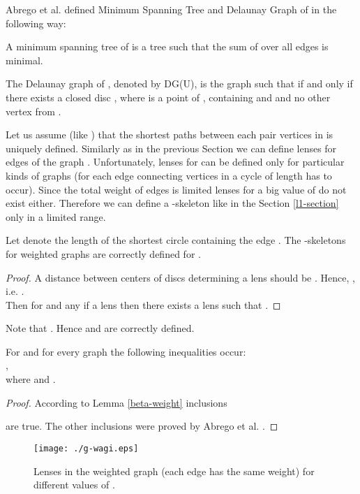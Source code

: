 \documentclass[11pt]{llncs}
\begin{document}
Abrego et al. \cite{a12} defined Minimum Spanning Tree and Delaunay Graph of  
in the following way:

\begin{definition}
A minimum spanning tree of  is a tree  such that the sum of  
over all edges  is minimal. 

The Delaunay graph of , denoted by DG(U), is the graph  such that 
 if and only if there exists a closed disc , where  is a 
point of , containing  and  and no other vertex from .

\end{definition}


Let us assume (like \cite{a12}) that the shortest paths between each pair vertices in  is uniquely 
defined. Similarly as in the previous Section we can define lenses  for edges 
of the graph .
Unfortunately, lenses for  can be defined only for particular kinds of graphs
(for each edge  connecting vertices in  a cycle of  
length has to occur). Since the total weight of edges is limited lenses for a big value 
of  do not exist either. Therefore we can define a -skeleton 
like in the Section \ref{l1-section} only in a limited range.

\begin{lemma}
\label{beta-weight}
Let  denote the length of the shortest circle containing the edge .
The -skeletons  for weighted graphs are correctly defined 
for .
\end{lemma}   
\begin{proof}
A distance between centers of discs determining a lens  should be
. Hence, , i.e.
. \\
Then for 
and any  if a lens  then there exists
a lens  such that . 
\end{proof}

Note that .
Hence  and  are correctly defined.

\begin{lemma}
For  and for every graph  the following inequalities occur: \\
, \\
where  and .
\end{lemma}
\begin{proof}
According to Lemma \ref{beta-weight} inclusions 

are true. The other inclusions were proved by Abrego et al. \cite{a12}. 
\end{proof}

\begin{figure}[htbp]
\centering
\texttt{[image: ./g-wagi.eps]}
\caption{Lenses in the weighted graph (each edge has the same weight) for different
values of .}
\label{fig:weighted}
\end{figure}
\end{document}

